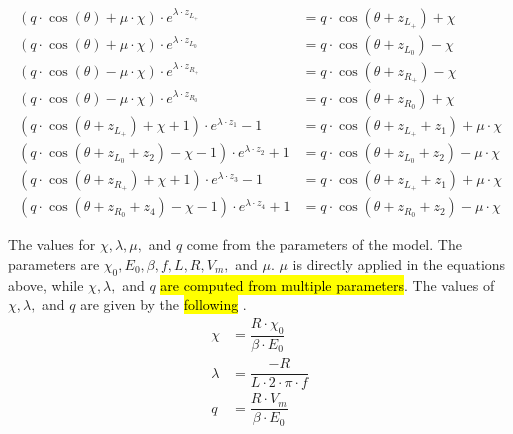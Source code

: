 \begin{subequations}
	\begin{align}
		(q \cdot \cos(\theta) + \mu \cdot \chi) \cdot e^{\lambda \cdot z_{L_+}}
		 & = q \cdot \cos(\theta + z_{L_+}) + \chi \label{equ:setup.og.def.impl.1.A}                  \\
		(q \cdot \cos(\theta) + \mu \cdot \chi) \cdot e^{\lambda \cdot z_{L_0}}
		 & = q \cdot \cos(\theta + z_{L_0}) - \chi                                                    \\
		(q \cdot \cos(\theta) - \mu \cdot \chi) \cdot e^{\lambda \cdot z_{R_+}}
		 & = q \cdot \cos(\theta + z_{R_+}) - \chi                                                    \\
		(q \cdot \cos(\theta) - \mu \cdot \chi) \cdot e^{\lambda \cdot z_{R_0}}
		 & = q \cdot \cos(\theta + z_{R_0}) + \chi \label{equ:setup.og.def.impl.1.D}
		\\
		(q \cdot \cos(\theta + z_{L_+}) + \chi + 1) \cdot e^{\lambda \cdot z_1} - 1
		 & = q \cdot  \cos(\theta + z_{L_+} + z_1) + \mu \cdot \chi \label{equ:setup.og.def.impl.2.A} \\
		(q \cdot \cos(\theta + z_{L_0} + z_2) - \chi - 1) \cdot e^{\lambda \cdot z_2} + 1
		 & = q \cdot  \cos(\theta + z_{L_0} + z_2) - \mu \cdot \chi                                   \\
		(q \cdot \cos(\theta + z_{R_+}) + \chi + 1) \cdot e^{\lambda \cdot z_3} - 1
		 & = q \cdot  \cos(\theta + z_{L_+} + z_1) + \mu \cdot \chi                                   \\
		(q \cdot \cos(\theta + z_{R_0} + z_4) - \chi - 1) \cdot e^{\lambda \cdot z_4} + 1
		 & = q \cdot  \cos(\theta + z_{R_0} + z_2) - \mu \cdot \chi \label{equ:setup.og.def.impl.2.D}
	\end{align}
\end{subequations}

The values for $\chi, \lambda, \mu,$ and $q$ come from the parameters of the model.
The parameters are $\chi_0, E_0, \beta, f, L, R, V_m,$ and $\mu$.
$\mu$ is directly applied in the equations above, while $\chi, \lambda,$ and $q$ \hl{are computed from multiple parameters}.
The values of $\chi, \lambda,$ and $q$ are given by the \hl{following }.
\begin{subequations}
	\begin{align}
		\chi    & = \dfrac{R \cdot \chi_0}{\beta \cdot E_0} \label{equ:setup.og.def.param.chi} \\
		\lambda & = \dfrac{-R}{L \cdot 2 \cdot \pi \cdot f}                                    \\
		q       & = \dfrac{R \cdot V_m}{\beta \cdot E_0} \label{equ:setup.og.def.param.q}
	\end{align}
\end{subequations}
